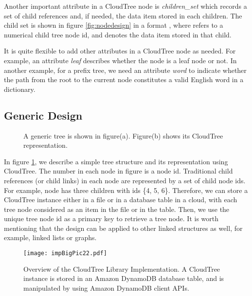 \documentclass[10pt, conference, compsocconf]{IEEEtran}
\begin{document}
Another important attribute in a CloudTree node is \emph{children\_set} which records a set of 
child references and, if needed, the data item stored in each children. The child set is shown in figure \ref{fig:nodedesign} in a format 
, where  refers to a numerical child tree node id, and  denotes the data item
stored in that child. 


It is quite flexible to add other attributes in a CloudTree node as needed.
For example, an attribute \emph{leaf} describes whether the node is a leaf node or not.
In another example, for a prefix tree, we need an attribute \emph{word} to 
indicate whether the path from the root to the current node constitutes a valid English word
in a dictionary.

\subsection{Generic Design}
 \begin{figure}[t]
\centering
{}
\hspace*{1cm}
 \caption[]{A generic tree is shown in figure(a). Figure(b) shows its CloudTree representation.
}
\label{fig:generic}
\end{figure}

In figure \ref{fig:generic}, we describe a simple tree structure and its representation using CloudTree.
The number in each node in figure  is a node id. 
Traditional child references (or child links) in each node are represented by a set of child node ids. 
For example, node  has three children with ids \{4, 5, 6\}. 
Therefore, we can store a CloudTree instance either in a file or in a database table in a cloud,
with each tree node considered as an item in the file or in the table. Then,
we use the unique tree node id as a primary key to retrieve a tree node. 
It is worth mentioning that the design can be applied to other linked structures as well, for example, 
linked lists or graphs. 



\begin{figure}[t]
\begin{center}
\texttt{[image: impBigPic22.pdf]}
\caption{Overview of the CloudTree Library Implementation. A CloudTree instance is stored in 
an Amazon DynamoDB database table, and is manipulated by using Amazon DynamoDB client APIs. }
\label{fig:impPic}
\end{center}
\end{figure}
\end{document}
